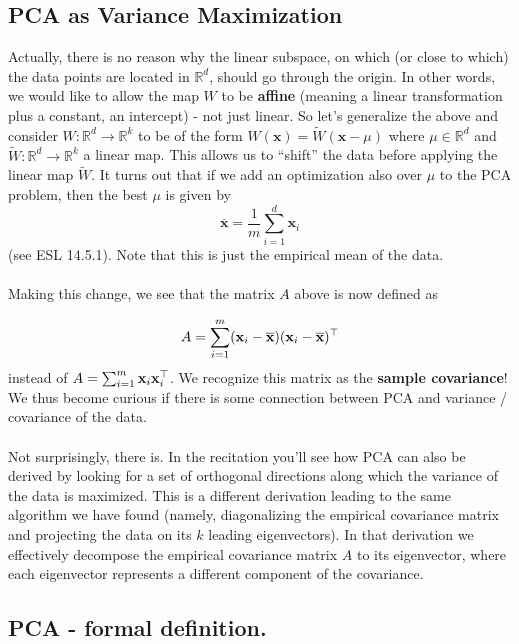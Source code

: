 \documentclass[11pt]{article}
\newcommand{\R}{\ensuremath{\mathbb{R}}}
\newcommand{\V}[1]{\mathbf{#1}}
\begin{document}
\subsection{PCA as Variance Maximization}

Actually, there is no reason why the linear subspace, on which (or close to
which) the data points are located in $\R^d$, should go through the origin. In
other words, we would like to allow the map $W$ to be {\bf affine} (meaning a
linear transformation plus a constant, an intercept) - not just linear.
So let's generalize the above and consider $W:\R^d\to\R^k$ to be of the
form $W(\V{x}) = \tilde{W}(\V{x}-\mu)$ where $\mu\in\R^d$ and
$\tilde{W}:\R^d\to\R^k$ a linear map.  This allows us to
``shift'' the data before applying the linear map $\tilde{W}$. 
It turns out that if we add an optimization also over $\mu$ to the PCA problem,
then the best $\mu$ is given by 
\[
  \overline{\V{x}} = \frac{1}{m}\sum_{i=1}^d \V{x}_i
\]
(see ESL 14.5.1). Note that this is just the empirical mean of the data. 
\\~\\
Making this change, we see that the matrix $A$ above is now defined as

\[
  A = \sum_{i=1}^m (\x_i-\overline{\V{x}}) (\x_i-\overline{\V{x}})^\top
\]
instead of
$A = \sum_{i=1}^m {\mathbf x}_i {\mathbf x}_i^\top$.
We recognize this matrix as the {\bf sample covariance}! We thus become curious
if there is some connection between PCA and variance / covariance of the data.
\\~\\
Not  surprisingly, there is. In the recitation you'll see how PCA can also be
derived by looking for a set of orthogonal 
directions along which the variance of the data is maximized. This is a
different derivation leading to the same algorithm we have found 
(namely, diagonalizing the
empirical covariance matrix and projecting the data on its $k$ 
leading eigenvectors). In that derivation we effectively decompose the empirical
covariance matrix $A$ to its eigenvector, where each eigenvector represents a
different component of the covariance.

\subsection{PCA - formal definition.}
\end{document}
